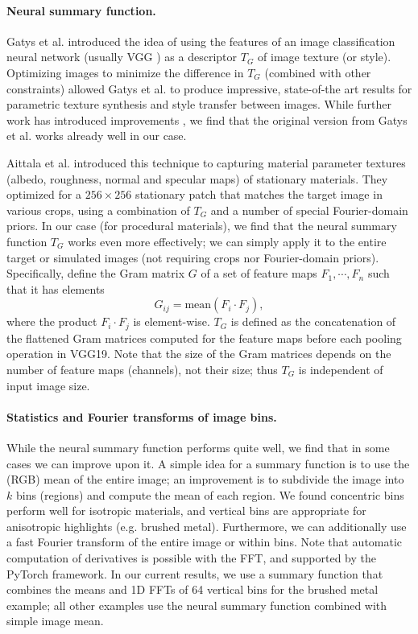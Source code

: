 \paragraph*{Neural summary function.}
Gatys et al. \cite{Gatys2015,Gatys2016} introduced the idea of using the features of an image classification neural network (usually VGG \cite{VGG}) as a descriptor $T_G$ of image texture (or style). Optimizing images to minimize the difference in $T_G$ (combined with other constraints) allowed Gatys et al. to produce impressive, state-of-the art results for parametric texture synthesis and style transfer between images. While further work  has introduced improvements \cite{Risser2017}, we find that the original version from Gatys et al. works already well in our case.

Aittala et al. \cite{Aittala2016} introduced this technique to capturing material parameter textures (albedo, roughness, normal and specular maps) of stationary materials. They optimized for a $256 \times 256$ stationary patch that matches the target image in various crops, using a combination of $T_G$ and a number of special Fourier-domain priors. In our case (for procedural materials), we find that the neural summary function $T_G$ works even more effectively; we can simply apply it to the entire target or simulated images (not requiring crops nor Fourier-domain priors).
%
Specifically, define the Gram matrix $G$ of a set of feature maps $F_1, \cdots, F_n$ such that it has elements
\begin{equation}
	G_{ij} = \mbox{mean}(F_i \cdot F_j),
\end{equation}
where the product $F_i \cdot F_j$ is element-wise. $T_G$ is defined as the concatenation of the flattened Gram matrices computed for the feature maps before each pooling operation in VGG19. Note that the size of the Gram matrices depends on the number of feature maps (channels), not their size; thus $T_G$ is independent of input image size.

\label{ssec:example_summary_func}

\paragraph*{Statistics and Fourier transforms of image bins.}
While the neural summary function performs quite well, we find that in some cases we can improve upon it.
A simple idea for a summary function is to use the (RGB) mean of the entire image; an improvement is to subdivide the image into $k$ bins (regions) and compute the mean of each region. We found concentric bins perform well for isotropic materials, and vertical bins are appropriate for anisotropic highlights (e.g. brushed metal). Furthermore, we can additionally use a fast Fourier transform of the entire image or within bins. Note that automatic computation of derivatives is possible with the FFT, and supported by the PyTorch framework. In our current results, we use a summary function that combines the means and 1D FFTs of 64 vertical bins for the brushed metal example; all other examples use the neural summary function combined with simple image mean.


% 
